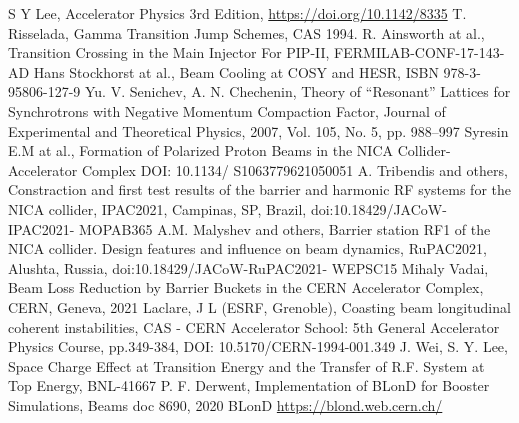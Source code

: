 \documentclass[a4paper,
               keeplastbox,   %
               ]{jacow}
\begin{document}
	
	{
	\begin{thebibliography}{9}
	
	S Y Lee, Accelerator Physics 3rd Edition, \url{https://doi.org/10.1142/8335}
	T. Risselada, Gamma Transition Jump Schemes, CAS 1994.
	R. Ainsworth at al., Transition Crossing in the Main Injector For PIP-II, FERMILAB-CONF-17-143-AD
	Hans Stockhorst at al., Beam Cooling at COSY and HESR, ISBN 978-3-95806-127-9
	Yu. V. Senichev, A. N. Chechenin, Theory of “Resonant” Lattices for Synchrotrons with Negative Momentum Compaction 		Factor, Journal of Experimental and Theoretical Physics, 2007, Vol. 105, No. 5, pp. 988–997
	Syresin E.M at al., Formation of Polarized Proton Beams in the NICA Collider-Accelerator Complex DOI: 10.1134/			S1063779621050051
	A. Tribendis and others, Constraction and first test results of the barrier 
	and harmonic RF systems for the NICA collider, IPAC2021, Campinas, SP, Brazil, doi:10.18429/JACoW-IPAC2021-			MOPAB365
	A.M. Malyshev and others, Barrier station RF1 of the NICA collider. 
	Design features and influence on beam dynamics, RuPAC2021, Alushta, Russia, doi:10.18429/JACoW-RuPAC2021-		WEPSC15
	Mihaly Vadai, Beam Loss Reduction by Barrier Buckets in the CERN Accelerator Complex, CERN, Geneva, 2021
	Laclare, J L (ESRF, Grenoble), Coasting beam longitudinal coherent instabilities, CAS - CERN Accelerator School: 5th 		General Accelerator Physics Course, pp.349-384, DOI: 10.5170/CERN-1994-001.349
	J. Wei, S. Y.  Lee, Space Charge Effect at Transition Energy and the Transfer of R.F. System at Top Energy, BNL-41667
	P. F. Derwent, Implementation of BLonD for Booster Simulations, Beams doc 8690, 2020
	BLonD
	\url{https://blond.web.cern.ch/}

	\end{thebibliography}
}
\end{document}
